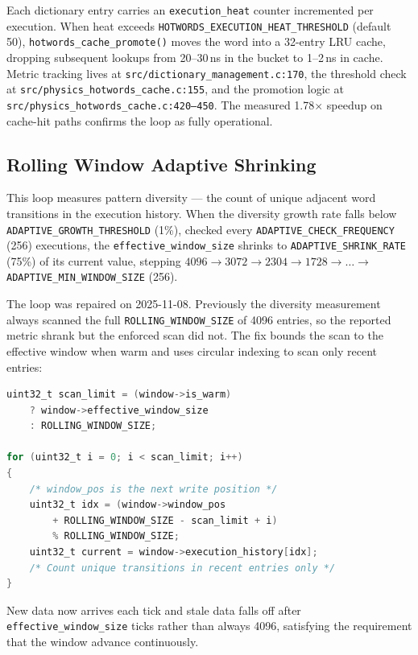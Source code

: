 Each dictionary entry carries an \texttt{execution\_heat} counter incremented per
execution. When heat exceeds \texttt{HOTWORDS\_EXECUTION\_HEAT\_THRESHOLD}
(default 50), \texttt{hotwords\_cache\_promote()} moves the word into a 32-entry
LRU cache, dropping subsequent lookups from 20--30\,ns in the bucket to 1--2\,ns
in cache. Metric tracking lives at \texttt{src/dictionary\_management.c:170}, the
threshold check at \texttt{src/physics\_hotwords\_cache.c:155}, and the promotion
logic at \texttt{src/physics\_hotwords\_cache.c:420--450}. The measured 1.78$\times$
speedup on cache-hit paths confirms the loop as fully operational.

\subsection{Rolling Window Adaptive Shrinking}

This loop measures pattern diversity --- the count of unique adjacent word
transitions in the execution history. When the diversity growth rate falls below
\texttt{ADAPTIVE\_GROWTH\_THRESHOLD} (1\%), checked every
\texttt{ADAPTIVE\_CHECK\_FREQUENCY} (256) executions, the
\texttt{effective\_window\_size} shrinks to \texttt{ADAPTIVE\_SHRINK\_RATE}
(75\%) of its current value, stepping $4096 \rightarrow 3072 \rightarrow 2304
\rightarrow 1728 \rightarrow \dots \rightarrow$
\texttt{ADAPTIVE\_MIN\_WINDOW\_SIZE} (256).

The loop was repaired on 2025-11-08. Previously the diversity measurement always
scanned the full \texttt{ROLLING\_WINDOW\_SIZE} of 4096 entries, so the reported
metric shrank but the enforced scan did not. The fix bounds the scan to the
effective window when warm and uses circular indexing to scan only recent
entries:

\begin{lstlisting}[language=C]
uint32_t scan_limit = (window->is_warm)
    ? window->effective_window_size
    : ROLLING_WINDOW_SIZE;

for (uint32_t i = 0; i < scan_limit; i++)
{
    /* window_pos is the next write position */
    uint32_t idx = (window->window_pos
        + ROLLING_WINDOW_SIZE - scan_limit + i)
        % ROLLING_WINDOW_SIZE;
    uint32_t current = window->execution_history[idx];
    /* Count unique transitions in recent entries only */
}
\end{lstlisting}

New data now arrives each tick and stale data falls off after
\texttt{effective\_window\_size} ticks rather than always 4096, satisfying the
requirement that the window advance continuously.

